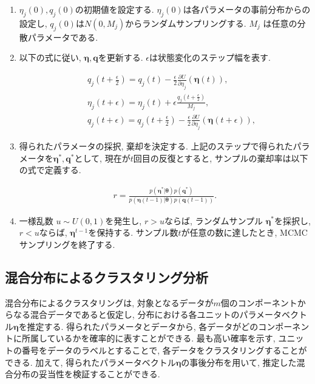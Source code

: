 \documentclass[a4j,12pt]{jarticle}
\begin{document}
\begin{enumerate}

\item{}
$\eta_j(0), q_j(0)$の初期値を設定する. $\eta_j(0)$は各パラメータの事前分布からの設定し, $q_j(0)$は$N(0,M_j)$からランダムサンプリングする. $M_j$ は任意の分散パラメータである. 
 
\item{}

以下の式に従い, $\bm \eta, \bm q$を更新する. $\epsilon$は状態変化のステップ幅を表す.

\begin{eqnarray*}
&&q_j(t+\frac{\epsilon}{2}) = q_j(t) - \frac{\epsilon}{2} \frac{\partial U}{\partial \eta_j} (\bm \eta(t)), \\
&&\eta_j(t+\epsilon) = \eta_j(t) + \epsilon \frac{q_j(t + \frac{\epsilon}{2})}{M_j}, \\
&&q_j(t+\epsilon) = q_j(t+\frac{\epsilon}{2}) - \frac{\epsilon}{2} \frac{\partial U}{\partial \eta_j} (\bm \eta(t + \epsilon)),
\end{eqnarray*}

\item{}
得られたパラメータの採択, 棄却を決定する. 上記のステップで得られたパラメータを$\bm \eta^*, \bm q^*$として,
現在が$t$回目の反復とすると, サンプルの棄却率は以下の式で定義する.

\begin{eqnarray*}
r = \frac{p(\bm \eta^*|\bm \theta) p(\bm q^*)}{p(\bm \eta(t-1)|\bm \theta) p(\bm q(t-1))}.
\end{eqnarray*}

\item{}
一様乱数 $u \sim U(0,1)$を発生し, $r > u$ならば, ランダムサンプル $\bm \eta^*$を採択し, $r < u$ならば, $\bm \eta^{t-1}$を保持する. サンプル数$t$が任意の数に達したとき, MCMCサンプリングを終了する. 

\end{enumerate}

\subsection{混合分布によるクラスタリング分析}

混合分布によるクラスタリングは, 対象となるデータが$m$個のコンポーネントからなる混合データであると仮定し, 分布における各ユニットのパラメータベクトル$\bm \eta$を推定する. 得られたパラメータとデータから, 各データがどのコンポーネントに所属しているかを確率的に表すことができる. 最も高い確率を示す, ユニットの番号をデータのラベルとすることで, 各データをクラスタリングすることができる. 加えて, 得られたパラメータベクトル$\bm \eta$の事後分布を用いて, 推定した混合分布の妥当性を検証することができる.
\end{document}
